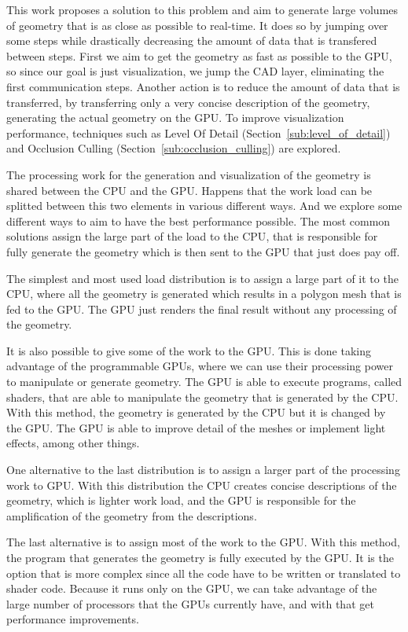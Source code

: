 This work proposes a solution to this problem and aim to generate large volumes of geometry that is as close as possible to real-time. It does so by jumping over some steps while drastically decreasing the amount of data that is transfered between steps. First we aim to get the geometry as fast as possible to the GPU, so since our goal is just visualization, we jump the CAD layer, eliminating the first communication steps. Another action is to reduce the amount of data that is transferred, by transferring only a very concise description of the geometry, generating the actual geometry on the GPU.
To improve visualization performance, techniques such as Level Of Detail (Section~\ref{sub:level_of_detail}) and Occlusion Culling (Section~\ref{sub:occlusion_culling}) are explored.

The processing work for the generation and visualization of the geometry is shared between the \gls{CPU} and the \gls{GPU}. Happens that the work load can be splitted between this two elements in various different ways. And we explore some different ways to aim to have the best performance possible.
The most common solutions assign the large part of the load to the \gls{CPU}, that is responsible for fully generate the geometry which is then sent to the \gls{GPU} that just does pay off.

The simplest and most used load distribution is to assign a large part of it to the \gls{CPU}, where all the geometry is generated which results in a polygon mesh that is fed to the \gls{GPU}. The \gls{GPU} just renders the final result without any processing of the geometry.

It is also possible to give some of the work to the \gls{GPU}. This is done taking advantage of the programmable \gls{GPU}s, where we can use their processing power to manipulate or generate geometry. The \gls{GPU} is able to execute programs, called shaders, that are able to manipulate the geometry that is generated by the \gls{CPU}. With this method, the geometry is generated by the \gls{CPU} but it is changed by the \gls{GPU}. The \gls{GPU} is able to improve detail of the meshes or implement light effects, among other things.

One alternative to the last distribution is to assign a larger part of the processing work to \gls{GPU}. With this distribution the \gls{CPU} creates concise descriptions of the geometry, which is lighter work load, and the \gls{GPU} is responsible for the amplification of the geometry from the descriptions.

The last alternative is to assign most of the work to the \gls{GPU}. With this method, the program that generates the geometry is fully executed by the \gls{GPU}. It is the option that is more complex since all the code have to be written or translated to shader code. Because it runs only on the \gls{GPU}, we can take advantage of the large number of processors that the \gls{GPU}s currently have, and with that get performance improvements.



